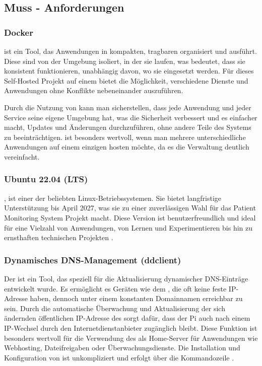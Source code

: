 \subsection{Muss - Anforderungen}

\subsubsection{Docker}
 ist ein Tool, das Anwendungen in kompakten, tragbaren  organisiert und ausführt. Diese  sind von der Umgebung isoliert, in der sie laufen, was bedeutet, dass sie konsistent funktionieren, unabhängig davon, wo sie eingesetzt werden. Für dieses Self-Hosted Projekt auf einem  bietet  die Möglichkeit, verschiedene Dienste und Anwendungen ohne Konflikte nebeneinander auszuführen.

Durch die Nutzung von  kann man sicherstellen, dass jede Anwendung und jeder Service seine eigene Umgebung hat, was die Sicherheit verbessert und es einfacher macht, Updates und Änderungen durchzuführen, ohne andere Teile des Systems zu beeinträchtigen.  ist besonders wertvoll, wenn man mehrere unterschiedliche Anwendungen auf einem einzigen  hosten möchte, da es die Verwaltung deutlich vereinfacht\cite{Docker}.

\subsubsection{Ubuntu 22.04 (LTS)}
, ist einer der beliebten Linux-Betriebssystemen. Sie bietet langfristige Unterstützung bis April 2027, was sie zu einer zuverlässigen Wahl für das Patient Monitoring System Projekt macht. Diese Version ist benutzerfreundlich und ideal für eine Vielzahl von Anwendungen, von Lernen und Experimentieren bis hin zu ernsthaften technischen Projekten \cite{Ubuntu}.

\subsubsection{Dynamisches DNS-Management (ddclient)}
Der  ist ein Tool, das speziell für die Aktualisierung dynamischer DNS-Einträge entwickelt wurde. Es ermöglicht es Geräten wie dem , die oft keine feste IP-Adresse haben, dennoch unter einem konstanten Domainnamen erreichbar zu sein. Durch die automatische Überwachung und Aktualisierung der sich ändernden öffentlichen IP-Adresse des  sorgt  dafür, dass der Pi auch nach einem IP-Wechsel durch den Internetdienstanbieter zugänglich bleibt. Diese Funktion ist besonders wertvoll für die Verwendung des  als Home-Server für Anwendungen wie Webhosting, Dateifreigaben oder Überwachungsdienste. Die Installation und Konfiguration von  ist unkompliziert und erfolgt über die Kommandozeile \cite{Ddclient}.

